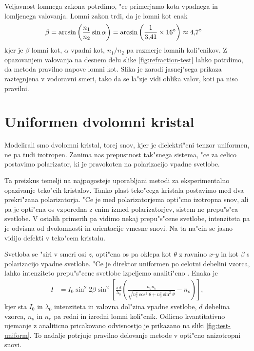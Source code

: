 \documentclass[12pt,twoside,openright,final,a4paper]{report}
\begin{document}
Veljavnost lomnega zakona potrdimo, "ce primerjamo kota vpadnega in lomljenega valovanja. 
Lomni zakon trdi, da je lomni kot enak
\begin{align}
 \beta &= \arcsin \left(\frac{n_1}{n_2} \sin \alpha \right) = \arcsin \left( \frac{1}{3,\!41} \times 16\degree \right) \approx 4,\!7\degree
\end{align}
kjer je $\beta$ lomni kot, $\alpha$ vpadni kot, $n_1/n_2$ pa razmerje lomnih koli"cnikov. 
Z opazovanjem valovanja na desnem delu slike \ref{fig:refraction-test} lahko potrdimo, da metoda pravilno napove lomni kot. 
Slika je zaradi jasnej"sega prikaza raztegnjena v vodoravni smeri, tako da se la"zje vidi oblika valov, koti pa niso pravilni. 

\section{Uniformen dvolomni kristal}
Modelirali smo dvolomni kristal, torej snov, kjer je dielektri"cni tenzor uniformen, ne pa tudi izotropen. 
Zanima nas prepustnost tak"snega sistema, "ce za celico postavimo polarizator, ki je pravokoten na polarizacijo vpadne svetlobe. 

Ta preizkus temelji na najpogosteje uporabljani metodi za eksperimentalno opazivanje teko"cih kristalov. 
Tanko plast teko"cega kristala postavimo med dva prekri"zana polarizatorja. 
"Ce je med polarizatorjema opti"cno izotropna snov, ali pa je opti"cna os vzporedna z enim izmed polarizatorjev, sistem ne prepu"s"ca svetlobe. 
V ostalih primerih pa vidimo nekaj prepu"s"cene svetlobe, intenziteta pa je odvisna od dvolomnosti in orientacije vmesne snovi. 
Na ta na"cin se jasno vidijo defekti v teko"cem kristalu. 

Svetloba se "siri v smeri osi $z$, opti"cna os pa oklepa kot $\theta$ z ravnino $x$-$y$ in kot $\beta$ s polarizacijo vpadne svetlobe. 
"Ce je direktor uniformen po celotni debelini vzorca, lahko intenziteto prepu"s"cene svetlobe izpeljemo analiti"cno \cite{kleman}. 
Enaka je
\begin{align}
 I &= I_0 \sin^2 2\beta \sin^2 \left[ \frac{\pi d}{\lambda_0} \left( \frac{n_o n_e}{\sqrt{n_e^2 \cos^2 \theta + n_0^2 \sin^2 \theta}} - n_o \right)\right],
\end{align}
kjer sta $I_0$ in $\lambda_0$ intenziteta in valovna dol"zina vpadne svetlobe, $d$ debelina vzorca, $n_o$ in $n_e$ pa redni in izredni lomni koli"cnik. 
Odlicno kvantitativno ujemanje z analiticno pricakovano odvisnostjo je prikazano na sliki \ref{fig:test-uniform}.
To nadalje potrjuje pravilno delovanje metode v opti"cno anizotropni snovi. 
\end{document}
